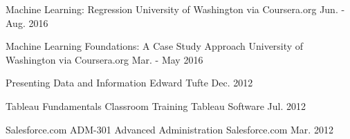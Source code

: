 \begin{cvhonors}


\cvhonor
{Machine Learning: Regression} %
{University of Washington via Coursera.org} %
{Jun. - Aug. 2016} %
{} 


\cvhonor
{Machine Learning Foundations: A Case Study Approach} %
{University of Washington via Coursera.org} %
{Mar. - May 2016} %
{} 


\cvhonor
{Presenting Data and Information} %
{Edward Tufte} %
{Dec. 2012} %
{} 


\cvhonor
{Tableau Fundamentals Classroom Training} %
{Tableau Software} %
{Jul. 2012} %
{} 


\cvhonor
{Salesforce.com ADM-301 Advanced Administration} %
{Salesforce.com} %
{Mar. 2012} %
{} 


\end{cvhonors}